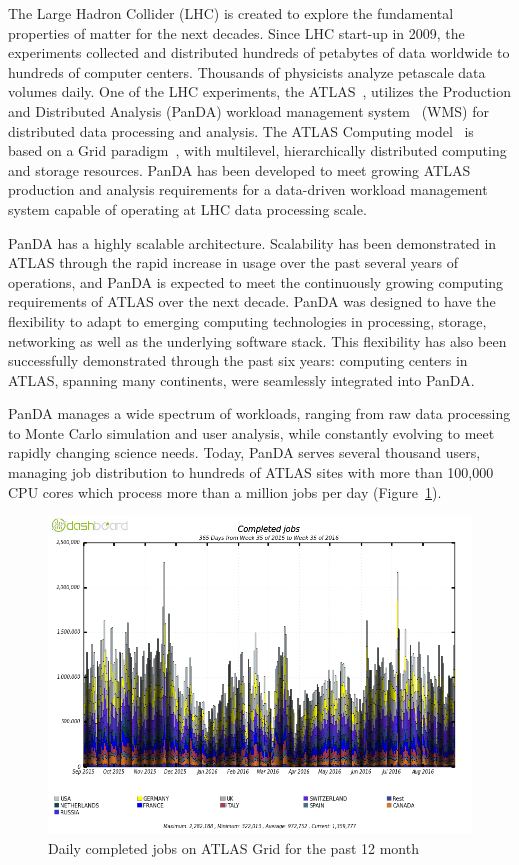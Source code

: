 The Large Hadron Collider (LHC) is created to explore the fundamental properties
of matter for the next decades. Since LHC start-up in 2009, the experiments
collected and distributed hundreds of petabytes of data worldwide to hundreds of
computer centers. Thousands of physicists analyze petascale data volumes daily.
One of the LHC experiments, the ATLAS~\cite{Aad:2008}, utilizes the Production
and Distributed Analysis (PanDA) workload management system~\cite{Maeno2011}
(WMS) for distributed data processing and analysis. The ATLAS Computing
model~\cite{Atlas2005} is based on a Grid paradigm~\cite{Foster:1998}, with
multilevel, hierarchically distributed computing and storage resources. PanDA
has been developed to meet growing ATLAS production and analysis requirements
for a data-driven workload management system capable of operating at LHC data
processing scale.

PanDA has a highly scalable architecture. Scalability has been demonstrated in
ATLAS through the rapid increase in usage over the past several years of
operations, and PanDA is expected to meet the continuously growing computing
requirements of ATLAS over the next decade. PanDA was designed to have the
flexibility to adapt to emerging computing technologies in processing, storage,
networking as well as the underlying software stack. This flexibility has also
been successfully demonstrated through the past six years: computing centers in
ATLAS, spanning many continents, were seamlessly integrated into PanDA\@.

PanDA manages a wide spectrum of workloads, ranging from raw data processing to
Monte Carlo simulation and user analysis, while constantly evolving to meet
rapidly changing science needs. Today, PanDA serves several thousand users,
managing job distribution to hundreds of ATLAS sites with more than 100,000 CPU
cores which process more than a million jobs per day (Figure~\ref{fig:daily}).

\begin{figure}
    \begin{center}
        \includegraphics[width=\columnwidth]{figures/DailyJobs.png}
        \caption{Daily completed jobs on ATLAS Grid for the past 12 month}
    \end{center}
\label{fig:daily}
\end{figure}


